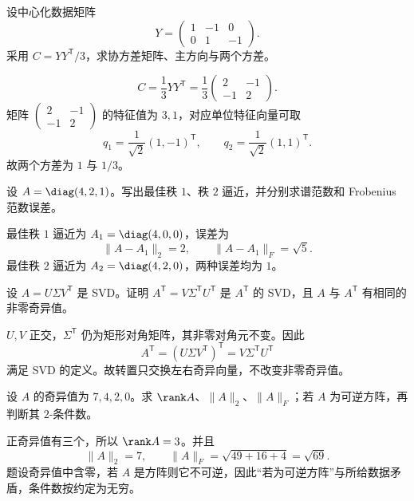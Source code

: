 \begin{exercise}[level=basic]
设中心化数据矩阵
\[
Y=\begin{pmatrix}1&-1&0\\0&1&-1\end{pmatrix}.
\]
采用 $C=YY^{\mathsf T}/3$，求协方差矩阵、主方向与两个方差。
\begin{solution}
\[
C=\frac13YY^{\mathsf T}
=\frac13\begin{pmatrix}2&-1\\-1&2\end{pmatrix}.
\]
矩阵 $\begin{pmatrix}2&-1\\-1&2\end{pmatrix}$ 的特征值为 $3,1$，对应单位特征向量可取
\[
q_1=\frac1{\sqrt2}(1,-1)^{\mathsf T},
\qquad
q_2=\frac1{\sqrt2}(1,1)^{\mathsf T}.
\]
故两个方差为 $1$ 与 $1/3$。
\end{solution}
\end{exercise}

\begin{exercise}[level=basic]
设 $A=\diag(4,2,1)$。写出最佳秩 $1$、秩 $2$ 逼近，并分别求谱范数和 Frobenius 范数误差。
\begin{solution}
最佳秩 $1$ 逼近为 $A_1=\diag(4,0,0)$，误差为
\[
\lVert A-A_1\rVert_2=2,
\qquad
\lVert A-A_1\rVert_F=\sqrt5.
\]
最佳秩 $2$ 逼近为 $A_2=\diag(4,2,0)$，两种误差均为 $1$。
\end{solution}
\end{exercise}

\begin{exercise}[level=basic]
设 $A=U\Sigma V^{\mathsf T}$ 是 SVD。证明 $A^{\mathsf T}=V\Sigma^{\mathsf T}U^{\mathsf T}$ 是 $A^{\mathsf T}$ 的 SVD，且 $A$ 与 $A^{\mathsf T}$ 有相同的非零奇异值。
\begin{solution}
$U,V$ 正交，$\Sigma^{\mathsf T}$ 仍为矩形对角矩阵，其非零对角元不变。因此
\[
A^{\mathsf T}=(U\Sigma V^{\mathsf T})^{\mathsf T}
=V\Sigma^{\mathsf T}U^{\mathsf T}
\]
满足 SVD 的定义。故转置只交换左右奇异向量，不改变非零奇异值。
\end{solution}
\end{exercise}

\begin{exercise}[level=basic]
设 $A$ 的奇异值为 $7,4,2,0$。求 $\rank A$、$\lVert A\rVert_2$、$\lVert A\rVert_F$；若 $A$ 为可逆方阵，再判断其 $2$-条件数。
\begin{solution}
正奇异值有三个，所以 $\rank A=3$。并且
\[
\lVert A\rVert_2=7,
\qquad
\lVert A\rVert_F=\sqrt{49+16+4}=\sqrt{69}.
\]
题设奇异值中含零，若 $A$ 是方阵则它不可逆，因此“若为可逆方阵”与所给数据矛盾，条件数按约定为无穷。
\end{solution}
\end{exercise}

